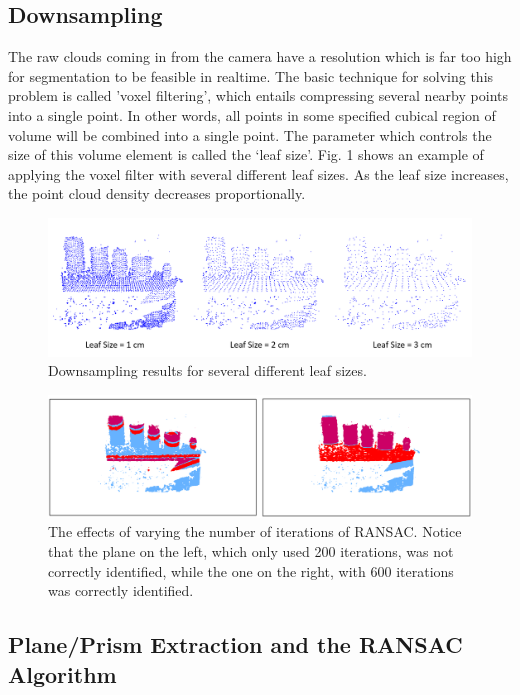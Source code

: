 \documentclass[journal]{IEEEtran}
\begin{document}
\subsection{Downsampling}
The raw clouds coming in from the camera have a resolution which is far too high for segmentation to be feasible in realtime.  The basic technique for solving this problem is called 'voxel filtering', which entails compressing several nearby points into a single point.  In other words, all points in some specified cubical region of volume will be combined into a single point.  The parameter which controls the size of this volume element is called the ‘leaf size’.  Fig. 1 shows an example of applying the voxel filter with several different leaf sizes.  As the leaf size increases, the point cloud density decreases proportionally.
\begin{figure}
  \includegraphics[width=\textwidth]{images/image11}
  \caption{Downsampling results for several different leaf sizes.}
\end{figure}
\begin{figure}
  \includegraphics[width=\textwidth]{images/image06-notext}
  \caption{The effects of varying the number of iterations of RANSAC.  Notice that the plane on the left, which only used 200 iterations, was not correctly identified, while the one on the right, with 600 iterations was correctly identified.}
\end{figure}

\subsection{Plane/Prism Extraction and the RANSAC Algorithm}
\end{document}

